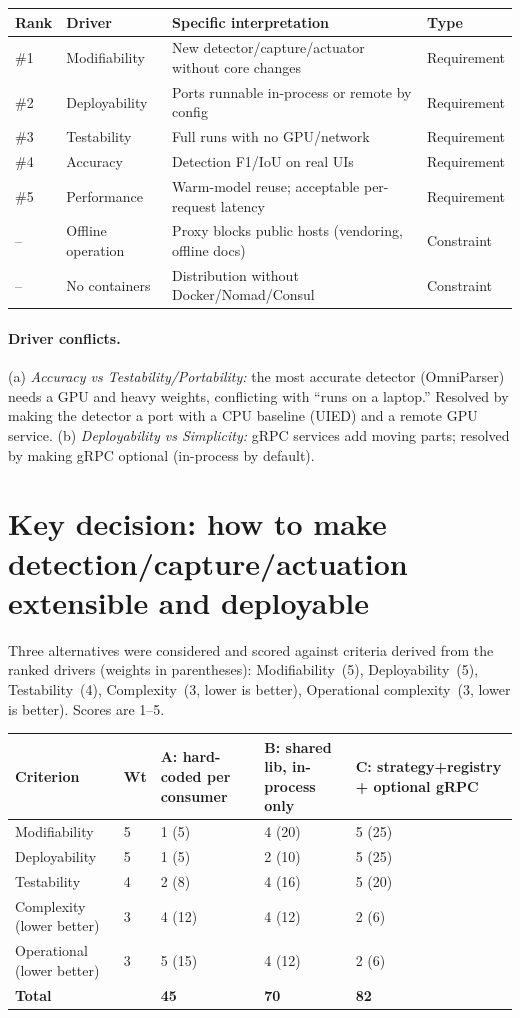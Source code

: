 \documentclass[11pt,a4paper]{report}
\begin{document}
\begin{longtable}{@{}p{0.8cm}p{2.8cm}p{7.4cm}p{2.4cm}@{}}
\toprule
\textbf{Rank} & \textbf{Driver} & \textbf{Specific interpretation} & \textbf{Type} \\
\midrule
\endhead
\#1 & Modifiability & New detector/capture/actuator without core changes & Requirement \\
\#2 & Deployability & Ports runnable in-process or remote by config & Requirement \\
\#3 & Testability & Full runs with no GPU/network & Requirement \\
\#4 & Accuracy & Detection F1/IoU on real UIs & Requirement \\
\#5 & Performance & Warm-model reuse; acceptable per-request latency & Requirement \\
-- & Offline operation & Proxy blocks public hosts (vendoring, offline docs) & Constraint \\
-- & No containers & Distribution without Docker/Nomad/Consul & Constraint \\
\bottomrule
\end{longtable}

\paragraph{Driver conflicts.}
(a) \emph{Accuracy vs Testability/Portability:} the most accurate detector
(OmniParser) needs a GPU and heavy weights, conflicting with ``runs on a laptop.''
Resolved by making the detector a port with a CPU baseline (UIED) and a remote GPU
service. (b) \emph{Deployability vs Simplicity:} gRPC services add moving parts;
resolved by making gRPC optional (in-process by default).

\section{Key decision: how to make detection/capture/actuation extensible and deployable}
Three alternatives were considered and scored against criteria derived from the
ranked drivers (weights in parentheses): Modifiability~(5), Deployability~(5),
Testability~(4), Complexity~(3, lower is better), Operational complexity~(3, lower
is better). Scores are 1--5.

\begin{longtable}{@{}p{5.2cm}p{1.2cm}p{2.2cm}p{2.2cm}p{2.2cm}@{}}
\toprule
\textbf{Criterion} & \textbf{Wt} & \textbf{A: hard-coded per consumer} & \textbf{B: shared lib, in-process only} & \textbf{C: strategy+registry + optional gRPC} \\
\midrule
\endhead
Modifiability & 5 & 1 (5) & 4 (20) & 5 (25) \\
Deployability & 5 & 1 (5) & 2 (10) & 5 (25) \\
Testability & 4 & 2 (8) & 4 (16) & 5 (20) \\
Complexity (lower better) & 3 & 4 (12) & 4 (12) & 2 (6) \\
Operational (lower better) & 3 & 5 (15) & 4 (12) & 2 (6) \\
\midrule
\textbf{Total} & & \textbf{45} & \textbf{70} & \textbf{82} \\
\bottomrule
\end{longtable}
\end{document}
